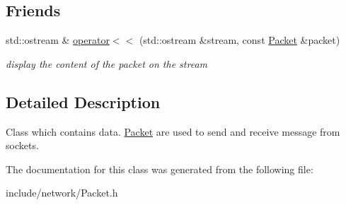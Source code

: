 \subsection*{Friends}
\begin{DoxyCompactItemize}
\item 
\hypertarget{class_f_t_p_1_1_packet_a845b2286ebe97771dfb21b69ee0f2f21}{std\-::ostream \& \hyperlink{class_f_t_p_1_1_packet_a845b2286ebe97771dfb21b69ee0f2f21}{operator$<$$<$} (std\-::ostream \&stream, const \hyperlink{class_f_t_p_1_1_packet}{Packet} \&packet)}\label{class_f_t_p_1_1_packet_a845b2286ebe97771dfb21b69ee0f2f21}

\begin{DoxyCompactList}\small\item\em display the content of the packet on the stream \end{DoxyCompactList}\end{DoxyCompactItemize}


\subsection{Detailed Description}
Class which contains data. \hyperlink{class_f_t_p_1_1_packet}{Packet} are used to send and receive message from sockets. 

The documentation for this class was generated from the following file\-:\begin{DoxyCompactItemize}
\item 
include/network/Packet.\-h\end{DoxyCompactItemize}
